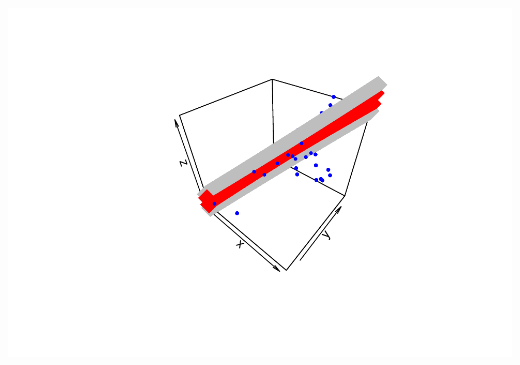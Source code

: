 \documentclass[]{article}
\begin{document}
\includegraphics{Izvjestaj_files/figure-latex/unnamed-chunk-39-1.pdf}
\end{document}
